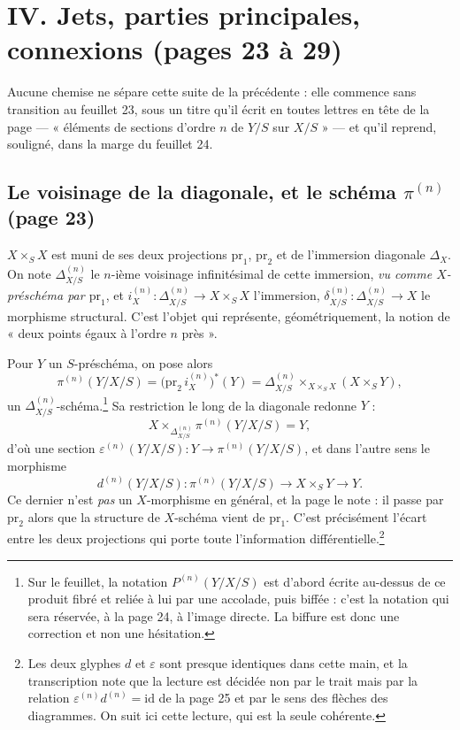 \documentclass[11pt,a4paper]{article}
\begin{document}
\section*{IV. Jets, parties principales, connexions (pages 23 à 29)}

Aucune chemise ne sépare cette suite de la précédente : elle commence sans
transition au feuillet 23, sous un titre qu'il écrit en toutes lettres en tête
de la page — « éléments de sections d'ordre $n$ de $Y/S$ sur $X/S$ » — et qu'il
reprend, souligné, dans la marge du feuillet 24.

\subsection*{Le voisinage de la diagonale, et le schéma $\pi^{(n)}$ (page 23)}

$X \times_{S} X$ est muni de ses deux projections $\mathrm{pr}_{1}$,
$\mathrm{pr}_{2}$ et de l'immersion diagonale $\Delta_{X}$. On note
$\Delta^{(n)}_{X/S}$ le $n$-ième voisinage infinitésimal de cette immersion,
\emph{vu comme $X$-préschéma par $\mathrm{pr}_{1}$}, et
$i^{(n)}_{X} : \Delta^{(n)}_{X/S} \to X \times_{S} X$ l'immersion,
$\delta^{(n)}_{X/S} : \Delta^{(n)}_{X/S} \to X$ le morphisme structural. C'est
l'objet qui représente, géométriquement, la notion de « deux points égaux à
l'ordre $n$ près ».

Pour $Y$ un $S$-préschéma, on pose alors
\[
  \pi^{(n)}(Y/X/S) = \bigl(\mathrm{pr}_{2}\, i^{(n)}_{X}\bigr)^{*}(Y)
  = \Delta^{(n)}_{X/S} \times_{X \times_{S} X} (X \times_{S} Y) ,
\]
un $\Delta^{(n)}_{X/S}$-schéma.\footnote{Sur le feuillet, la notation
$P^{(n)}(Y/X/S)$ est d'abord écrite au-dessus de ce produit fibré et reliée à
lui par une accolade, puis biffée : c'est la notation qui sera réservée, à la
page 24, à l'image directe. La biffure est donc une correction et non une
hésitation.} Sa restriction le long de la diagonale redonne $Y$ :
\[
  X \times_{\Delta^{(n)}_{X/S}} \pi^{(n)}(Y/X/S) = Y ,
\]
d'où une section $\varepsilon^{(n)}(Y/X/S) : Y \to \pi^{(n)}(Y/X/S)$, et dans
l'autre sens le morphisme
\[
  d^{(n)}(Y/X/S) : \pi^{(n)}(Y/X/S) \longrightarrow X \times_{S} Y
  \longrightarrow Y .
\]
Ce dernier n'est \emph{pas} un $X$-morphisme en général, et la page le note :
il passe par $\mathrm{pr}_{2}$ alors que la structure de $X$-schéma vient de
$\mathrm{pr}_{1}$. C'est précisément l'écart entre les deux projections qui
porte toute l'information différentielle.\footnote{Les deux glyphes $d$ et
$\varepsilon$ sont presque identiques dans cette main, et la transcription note
que la lecture est décidée non par le trait mais par la relation
$\varepsilon^{(n)} d^{(n)} = \mathrm{id}$ de la page 25 et par le sens des
flèches des diagrammes. On suit ici cette lecture, qui est la seule cohérente.}
\end{document}
